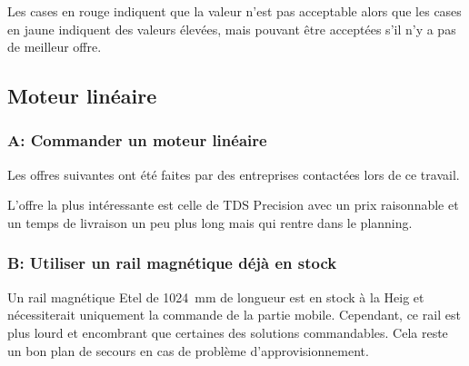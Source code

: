Les cases en rouge indiquent que la valeur n'est pas acceptable alors que les cases en jaune indiquent des valeurs élevées, mais pouvant être
acceptées s'il n'y a pas de meilleur offre.

\subsection{Moteur linéaire}
\subsubsection{A: Commander un moteur linéaire}
Les offres suivantes ont été faites par des entreprises contactées lors de ce travail.

\begin{table}[H]
  \centering
  \caption{Offres pour le moteur linéaire}
  \label{tab:OffreMot}
\end{table}

L'offre la plus intéressante est celle de TDS Precision \cite{TDSPrecisionProducts} avec un prix raisonnable et un temps de livraison un peu plus long mais qui rentre dans le planning.

\subsubsection{B: Utiliser un rail magnétique déjà en stock}
Un rail magnétique Etel \cite{Etel} de 1024~mm de longueur est en stock à la \acrshort{Heig} et nécessiterait uniquement la commande de la partie mobile. Cependant, ce
rail est plus lourd et encombrant que certaines des solutions commandables. Cela reste un bon plan de secours en cas de problème d'approvisionnement.


